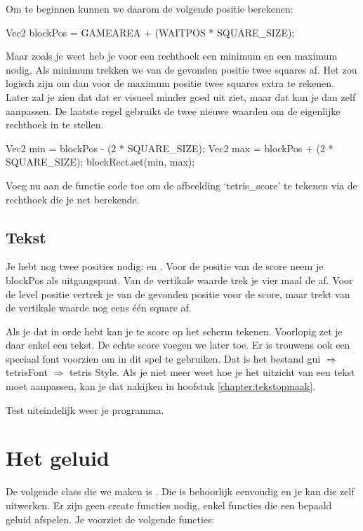 Om te beginnen kunnen we daarom de volgende positie berekenen:

\begin{code}
Vec2 blockPos = GAMEAREA + (WAITPOS * SQUARE_SIZE);
\end{code}

Maar zoals je weet heb je voor een rechthoek een minimum en een maximum nodig. Als minimum trekken we van de gevonden positie twee squares af. Het zou logisch zijn om dan voor de maximum positie twee squares extra te rekenen. Later zal je zien dat dat er visueel minder goed uit ziet, maar dat kan je dan zelf aanpassen. De laatste regel gebruikt de twee nieuwe waarden om de eigenlijke rechthoek in te stellen.

\begin{code}
Vec2 min = blockPos - (2 * SQUARE_SIZE);
Vec2 max = blockPos + (2 * SQUARE_SIZE);
blockRect.set(min, max);
\end{code}

Voeg nu aan de functie  code toe om de afbeelding `tetris\_score' te tekenen via de rechthoek die je net berekende.

\subsection{Tekst}
Je hebt nog twee posities nodig:  en . Voor de positie van de score neem je blockPos als uitgangspunt. Van de vertikale waarde trek je vier maal de  af. Voor de level positie vertrek je van de gevonden positie voor de score, maar trekt van de vertikale waarde nog eens \'e\'en square af.

Als je dat in orde hebt kan je te score op het scherm tekenen. Voorlopig zet je daar enkel een tekst. De echte score voegen we later toe. Er is trouwens ook een speciaal font voorzien om in dit spel te gebruiken. Dat is het bestand gui $\Rightarrow$ tetrisFont $\Rightarrow$ tetris Style. Als je niet meer weet hoe je het uitzicht van een tekst moet aanpassen, kan je dat nakijken in hoofstuk \ref{chapter:tekstopmaak}.

Test uiteindelijk weer je programma.

\section{Het geluid}
De volgende class die we maken is . Die is behoorlijk eenvoudig en je kan die zelf uitwerken. Er zijn geen create functies nodig, enkel functies die een bepaald geluid afspelen. Je voorziet de volgende functies:

